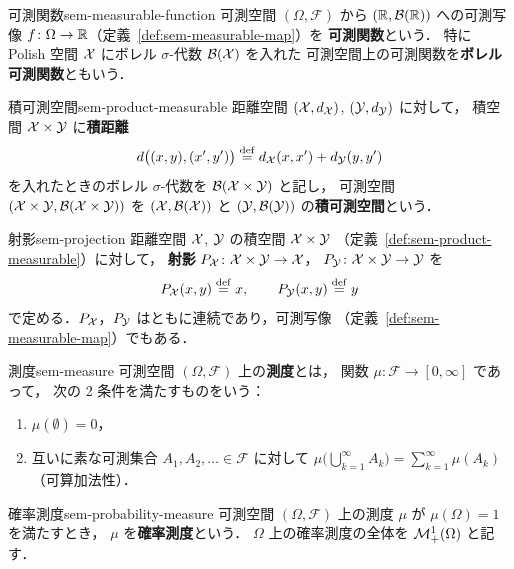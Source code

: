 \begin{definition}{可測関数}{sem-measurable-function}
  可測空間 $(\Omega, \mathcal{F})$ から $(\mathbb{R}, \mathcal{B}(\mathbb{R}))$ への可測写像
  $f \colon \Omega \to \mathbb{R}$（定義~\ref{def:sem-measurable-map}）を
  \textbf{可測関数}という．
  特に Polish 空間 $\mathcal{X}$ にボレル $\sigma$-代数 $\mathcal{B}(\mathcal{X})$ を入れた
  可測空間上の可測関数を\textbf{ボレル可測関数}ともいう．
\end{definition}

\begin{definition}{積可測空間}{sem-product-measurable}
  距離空間 $(\mathcal{X}, d_{\mathcal{X}})$, $(\mathcal{Y}, d_{\mathcal{Y}})$ に対して，
  積空間 $\mathcal{X} \times \mathcal{Y}$ に\textbf{積距離}
  \[
    d\bigl((x, y), (x', y')\bigr) \overset{\mathrm{def}}{=} d_{\mathcal{X}}(x, x') + d_{\mathcal{Y}}(y, y')
  \]
  を入れたときのボレル $\sigma$-代数を $\mathcal{B}(\mathcal{X} \times \mathcal{Y})$ と記し，
  可測空間 $(\mathcal{X} \times \mathcal{Y}, \mathcal{B}(\mathcal{X} \times \mathcal{Y}))$ を
  $(\mathcal{X}, \mathcal{B}(\mathcal{X}))$ と $(\mathcal{Y}, \mathcal{B}(\mathcal{Y}))$ の\textbf{積可測空間}という．
\end{definition}

\begin{definition}{射影}{sem-projection}
  距離空間 $\mathcal{X}$, $\mathcal{Y}$ の積空間 $\mathcal{X} \times \mathcal{Y}$
  （定義~\ref{def:sem-product-measurable}）に対して，
  \textbf{射影} $P_{\mathcal{X}} \colon \mathcal{X} \times \mathcal{Y} \to \mathcal{X}$，
  $P_{\mathcal{Y}} \colon \mathcal{X} \times \mathcal{Y} \to \mathcal{Y}$ を
  \[
    P_{\mathcal{X}}(x, y) \overset{\mathrm{def}}{=} x,
    \qquad
    P_{\mathcal{Y}}(x, y) \overset{\mathrm{def}}{=} y
  \]
  で定める．$P_{\mathcal{X}}$，$P_{\mathcal{Y}}$ はともに連続であり，可測写像
  （定義~\ref{def:sem-measurable-map}）でもある．
\end{definition}

\begin{definition}{測度}{sem-measure}
  可測空間 $(\Omega, \mathcal{F})$ 上の\textbf{測度}とは，
  関数 $\mu \colon \mathcal{F} \to [0, \infty]$ であって，
  次の 2 条件を満たすものをいう：
  \begin{enumerate}
    \item[(i)] $\mu(\emptyset) = 0$，
    \item[(ii)] 互いに素な可測集合 $A_1, A_2, \ldots \in \mathcal{F}$ に対して
      $\mu\bigl(\bigcup_{k=1}^{\infty} A_k\bigr) = \sum_{k=1}^{\infty} \mu(A_k)$
      （可算加法性）．
  \end{enumerate}
\end{definition}

\begin{definition}{確率測度}{sem-probability-measure}
  可測空間 $(\Omega, \mathcal{F})$ 上の測度 $\mu$ が $\mu(\Omega) = 1$ を満たすとき，
  $\mu$ を\textbf{確率測度}という．
  $\Omega$ 上の確率測度の全体を $\mathcal{M}_+^1(\Omega)$ と記す．
\end{definition}

